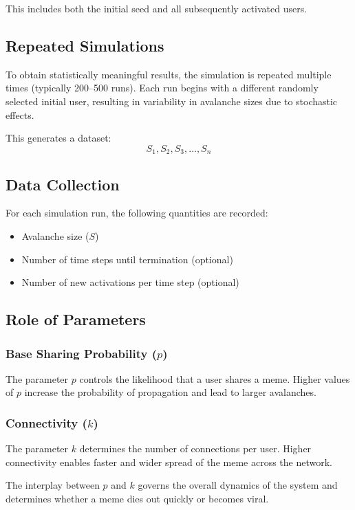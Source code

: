 \documentclass[12pt]{article}
\begin{document}
This includes both the initial seed and all subsequently activated users.

\subsection{Repeated Simulations}

To obtain statistically meaningful results, the simulation is repeated multiple times (typically 200--500 runs). Each run begins with a different randomly selected initial user, resulting in variability in avalanche sizes due to stochastic effects.

This generates a dataset:
\[
S_1, S_2, S_3, \dots, S_n
\]

\subsection{Data Collection}

For each simulation run, the following quantities are recorded:
\begin{itemize}
    \item Avalanche size ($S$)
    \item Number of time steps until termination (optional)
    \item Number of new activations per time step (optional)
\end{itemize}

\subsection{Role of Parameters}

\subsubsection{Base Sharing Probability ($p$)}

The parameter $p$ controls the likelihood that a user shares a meme. Higher values of $p$ increase the probability of propagation and lead to larger avalanches.

\subsubsection{Connectivity ($k$)}

The parameter $k$ determines the number of connections per user. Higher connectivity enables faster and wider spread of the meme across the network.

The interplay between $p$ and $k$ governs the overall dynamics of the system and determines whether a meme dies out quickly or becomes viral.
\end{document}
